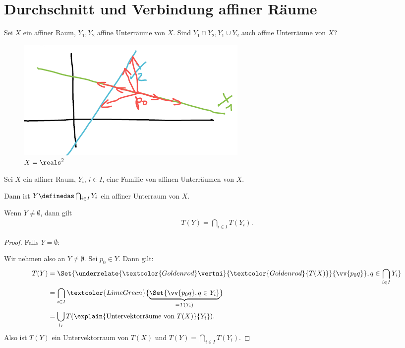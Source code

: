 \section{Durchschnitt und Verbindung affiner Räume}
\begin{frage*}
    Sei \( X \) ein affiner Raum, \(    Y_1, Y_2 \) affine Unterräume von \( X \). Sind \( Y_1\cap Y_2, Y_1\cup Y_2 \) auch affine Unterräume von \( X \)?
    \begin{figure}[H]
        \centering
        \includegraphics[width=0.5\linewidth]{figures/verbindung_affine_raeume}
        \caption*{\( X=\reals^2 \)}
        \label{fig:verbindung_affine_raeume}
    \end{figure}
\end{frage*}
\begin{lemma}\label{schnittraum:translationen}
    Sei \( X \) ein affiner Raum, \( Y_i \), \( i\in I \), eine Familie von affinen Unterräumen von \( X \).

    Dann ist \( Y\definedas \bigcap_{i\in I} Y_i \) ein affiner Unterraum von \( X \).

    Wenn \( Y\neq \emptyset \), dann gilt
    \begin{align*}
        T(Y)=\bigcap_{i\in I}T(Y_i).
    \end{align*}
\end{lemma}
\begin{proof}
    Falls \( Y=\emptyset \): \checkmark

    Wir nehmen also an \( Y\neq \emptyset \).
    Sei \( p_0\in Y \).
    Dann gilt:
    \begin{align*}
        T(Y)\begin{aligned}[t] 
            &=\Set{\underrelate{\textcolor{Goldenrod}\vertni}{\textcolor{Goldenrod}{T(X)}}{\vv{p_0 q}},q\in \bigcap_{i\in I}Y_i}\\
            &=\bigcap_{i\in I}\textcolor{LimeGreen}{\underbrace{\Set{\vv{p_0 q}, q\in Y_i}}_{=T(Y_i)}}\\
            &=\bigcup_{i_I}T(\explain{\text{Untervektorräume von \( T(X) \)}}{Y_i}).
        \end{aligned}
    \end{align*}
    Also ist \( T(Y) \) ein Untervektorraum von \( T(X) \) und \( T(Y)=\bigcap_{i\in I}T(Y_i) \).
\end{proof}
